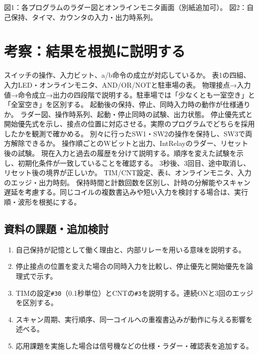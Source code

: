 \documentclass[lualatex,a4paper,10pt]{jlreq}
\begin{document}
図1：各プログラムのラダー図とオンラインモニタ画面（別紙追加可）。
\writing{42mm}
図2：自己保持、タイマ、カウンタの入力・出力時系列。
\writing{35mm}
\clearpage\section{考察：結果を根拠に説明する}\label{sec:auto6}
{スイッチの操作、入力ビット、a/b命令の成立が対応しているか。}
{表1の四組、入力LED・オンラインモニタ、AND/OR/NOTと駐車場の表。}
{物理接点→入力値→命令成立→出力の四段階で説明する。駐車場では「少なくとも一室空き」と「全室空き」を区別する。}
{起動後の保持、停止、同時入力時の動作が仕様通りか。}
{ラダー図、操作時系列、起動・停止同時の試験、出力状態。}
{停止優先式と開始優先式を示し、接点の位置に対応させる。実際のプログラムでどちらを採用したかを観測で確かめる。}
{別々に行ったSW1・SW2の操作を保持し、SW3で両方解除できるか。}
{操作順ごとのWビットと出力、IntRelayのラダー、リセット後の試験。}
{現在入力と過去の履歴を分けて説明する。順序を変えた試験を示し、初期化条件が一致していることを確認する。}
{3秒後、3回目、途中取消し、リセット後の境界が正しいか。}
{TIM/CNT設定、表4、オンラインモニタ、入力のエッジ・出力時刻。}
{保持時間と計数回数を区別し、計時の分解能やスキャン遅延を考慮する。同じコイルの複数書込みや短い入力を検討する場合は、実行順・波形を根拠にする。}
\subsection{資料の課題・追加検討}
\begin{enumerate}
\item 自己保持が記憶として働く理由と、内部リレーを用いる意味を説明する。
\item 停止接点の位置を変えた場合の同時入力を比較し、停止優先と開始優先を論理式で示す。
\item TIMの設定\texttt{\#30}（0.1秒単位）とCNTの\texttt{\#3}を説明する。連続ONと3回のエッジを区別する。
\item スキャン周期、実行順序、同一コイルへの重複書込みが動作に与える影響を述べる。
\item 応用課題を実施した場合は信号機などの仕様・ラダー・確認表を追加する。
\end{enumerate}
\writing{22mm}
\end{document}
